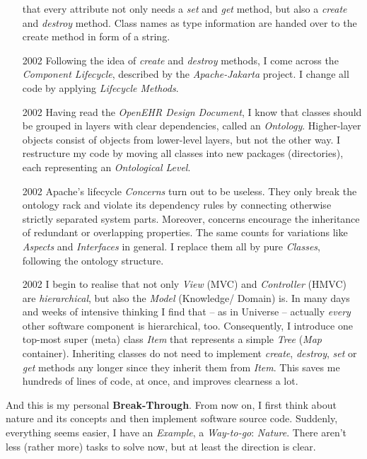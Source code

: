 \begin{itemize}
        that every attribute not only needs a \emph{set} and \emph{get} method,
        but also a \emph{create} and \emph{destroy} method. Class names as type
        information are handed over to the create method in form of a string.
    \item[2002] Following the idea of \emph{create} and \emph{destroy} methods,
        I come across the \emph{Component Lifecycle}, described by the
        \emph{Apache-Jakarta} project. I change all code by applying
        \emph{Lifecycle Methods}.
    \item[2002] Having read the \emph{OpenEHR Design Document}, I know that
        classes should be grouped in layers with clear dependencies, called an
        \emph{Ontology}. Higher-layer objects consist of objects from lower-level
        layers, but not the other way. I restructure my code by moving all
        classes into new packages (directories), each representing an
        \emph{Ontological Level}.
    \item[2002] Apache's lifecycle \emph{Concerns} turn out to be useless. They
        only break the ontology rack and violate its dependency rules by
        connecting otherwise strictly separated system parts. Moreover, concerns
        encourage the inheritance of redundant or overlapping properties. The
        same counts for variations like \emph{Aspects} and \emph{Interfaces} in
        general. I replace them all by pure \emph{Classes}, following the
        ontology structure.
    \item[2002] I begin to realise that not only \emph{View} (MVC) and
        \emph{Controller} (HMVC) are \emph{hierarchical}, but also the
        \emph{Model} (Knowledge/ Domain) is. In many days and weeks of intensive
        thinking I find that -- as in Universe -- actually \emph{every} other
        software component is hierarchical, too. Consequently, I introduce one
        top-most super (meta) class \emph{Item} that represents a simple
        \emph{Tree} (\emph{Map} container). Inheriting classes do not need to
        implement \emph{create}, \emph{destroy}, \emph{set} or \emph{get}
        methods any longer since they inherit them from \emph{Item}. This saves
        me hundreds of lines of code, at once, and improves clearness a lot.
\end{itemize}

And this is my personal \textbf{Break-Through}. From now on, I first think
about nature and its concepts and then implement software source code.
Suddenly, everything seems easier, I have an \emph{Example}, a
\emph{Way-to-go}: \emph{Nature}. There aren't less (rather more) tasks to solve
now, but at least the direction is clear.


